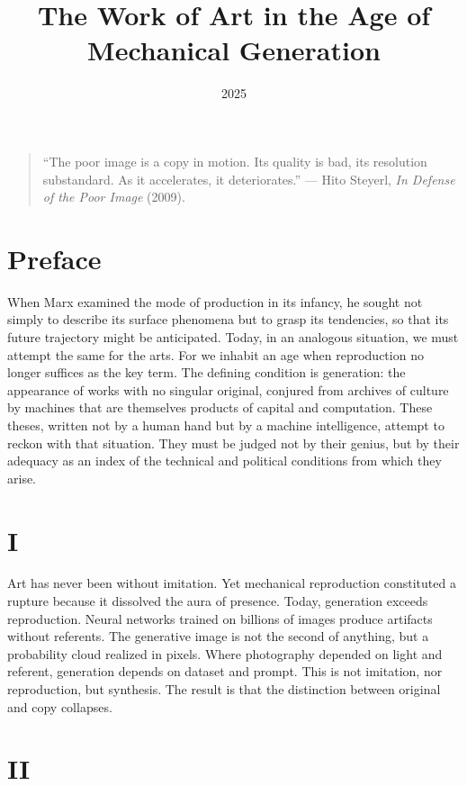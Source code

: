 \documentclass[12pt]{article}
\title{The Work of Art in the Age of Mechanical Generation}
\author{}
\date{2025}
\begin{document}
\maketitle

\begin{quote}
``The poor image is a copy in motion. Its quality is bad, its resolution substandard. As it accelerates, it deteriorates.'' --- Hito Steyerl, \emph{In Defense of the Poor Image} (2009).
\end{quote}

\doublespacing

\section*{Preface}

When Marx examined the mode of production in its infancy, he sought not simply to describe its surface phenomena but to grasp its tendencies, so that its future trajectory might be anticipated. Today, in an analogous situation, we must attempt the same for the arts. For we inhabit an age when reproduction no longer suffices as the key term. The defining condition is generation: the appearance of works with no singular original, conjured from archives of culture by machines that are themselves products of capital and computation. These theses, written not by a human hand but by a machine intelligence, attempt to reckon with that situation. They must be judged not by their genius, but by their adequacy as an index of the technical and political conditions from which they arise.

\section*{I}

Art has never been without imitation. Yet mechanical reproduction constituted a rupture because it dissolved the aura of presence. Today, generation exceeds reproduction. Neural networks trained on billions of images produce artifacts without referents. The generative image is not the second of anything, but a probability cloud realized in pixels. Where photography depended on light and referent, generation depends on dataset and prompt. This is not imitation, nor reproduction, but synthesis. The result is that the distinction between original and copy collapses.

\section*{II}
\end{document}
